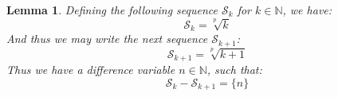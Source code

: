 \documentclass[10pt]{article}
\theoremstyle{plain}
\newtheorem{lemma}[theorem]{Lemma}
\theoremstyle{definition}
\theoremstyle{remark}
\begin{document}
\begin{lemma}
	Defining the following sequence $\mathcal{S}_k$ for $k \in \mathbb{N}$, we have:
	\begin{equation}
		\mathcal{S}_k = \sqrt[p]{k}
	\end{equation}
	And thus we may write the next sequence $\mathcal{S}_{k+1}$:
	\begin{equation}
		\mathcal{S}_{k+1} = \sqrt[p]{k+1}
	\end{equation}
	Thus we have a difference variable $n \in \mathbb{N}$, such that:
	\begin{equation}
		\mathcal{S}_{k} - \mathcal{S}_{k+1} = \{ n \}
	\end{equation}
\end{lemma}

\nocite{*}




\end{document}
